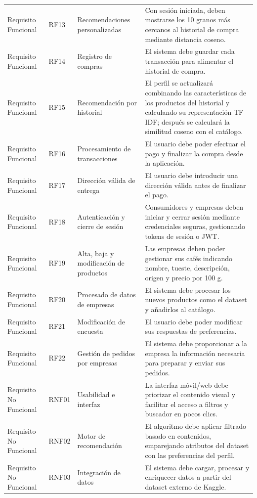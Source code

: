 \begin{longtable}{p{2.8cm}p{1.1cm}p{4.1cm}p{7cm}}
Requisito Funcional & RF13 & Recomendaciones personalizadas & Con sesión iniciada, deben mostrarse los 10 granos más cercanos al historial de compra mediante distancia coseno.\\
Requisito Funcional & RF14 & Registro de compras & El sistema debe guardar cada transacción para alimentar el historial de compra.\\
Requisito Funcional & RF15 & Recomendación por historial & El perfil se actualizará combinando las características de los productos del historial y calculando su representación TF-IDF; después se calculará la similitud coseno con el catálogo.\\
Requisito Funcional & RF16 & Procesamiento de transacciones & El usuario debe poder efectuar el pago y finalizar la compra desde la aplicación.\\
Requisito Funcional & RF17 & Dirección válida de entrega & El usuario debe introducir una dirección válida antes de finalizar el pago.\\
Requisito Funcional & RF18 & Autenticación y cierre de sesión & Consumidores y empresas deben iniciar y cerrar sesión mediante credenciales seguras, gestionando tokens de sesión o JWT.\\
Requisito Funcional & RF19 & Alta, baja y modificación de productos & Las empresas deben poder gestionar sus cafés indicando nombre, tueste, descripción, origen y precio por 100 g.\\
Requisito Funcional & RF20 & Procesado de datos de empresas & El sistema debe procesar los nuevos productos como el dataset y añadirlos al catálogo.\\
Requisito Funcional & RF21 & Modificación de encuesta & El usuario debe poder modificar sus respuestas de preferencias.\\
Requisito Funcional & RF22 & Gestión de pedidos por empresas & El sistema debe proporcionar a la empresa la información necesaria para preparar y enviar sus pedidos.\\
Requisito No Funcional & RNF01 & Usabilidad e interfaz & La interfaz móvil/web debe priorizar el contenido visual y facilitar el acceso a filtros y buscador en pocos clics.\\
Requisito No Funcional & RNF02 & Motor de recomendación & El algoritmo debe aplicar filtrado basado en contenidos, emparejando atributos del dataset con las preferencias del perfil.\\
Requisito No Funcional & RNF03 & Integración de datos & El sistema debe cargar, procesar y enriquecer datos a partir del dataset externo de Kaggle.\\

\end{longtable}
